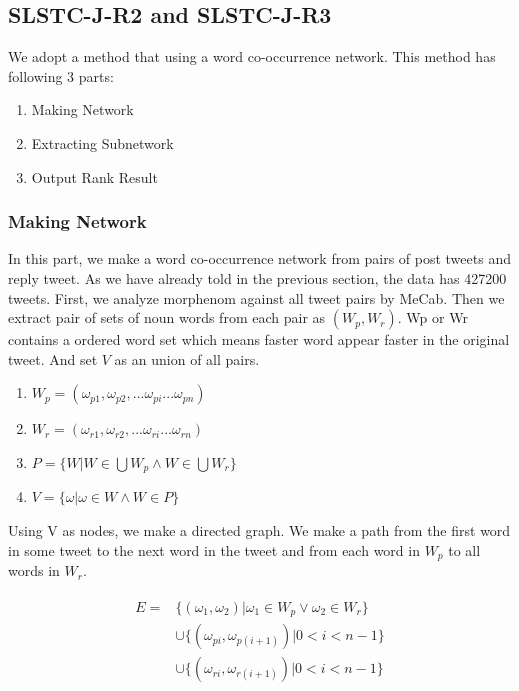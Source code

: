 \documentclass{../style/sig-alternate}
\begin{document}
\subsection{SLSTC-J-R2 and SLSTC-J-R3}
We adopt a method that using a word co-occurrence network.
This method has following 3 parts:
\begin{enumerate}
    \item Making Network
    \item Extracting Subnetwork
    \item Output Rank Result
\end{enumerate} 

\subsubsection{Making Network}
In this part, we make a word co-occurrence network from pairs of post tweets and reply tweet.
As we have already told in the previous section, the data has 427200 tweets. 
First, we analyze morphenom against all tweet pairs by MeCab. Then we extract pair of sets of noun words from each pair as \((W_{p}, W_{r})\). Wp or Wr contains a ordered word set which means faster word appear faster in the original tweet. And set \(V\) as an union of all pairs.

\begin{enumerate}
    \item \(W_{p} = (\omega_{p1}, \omega_{p2}, ... \omega_{pi} ... \omega_{pn}) \)
    \item \(W_{r} = (\omega_{r1}, \omega_{r2}, ... \omega_{ri} ... \omega_{rn}) \)
    \item \(P = \{W | W \in \bigcup W_{p} \wedge W \in \bigcup W_{r}\}\)
    \item \(V = \{\omega | \omega \in W \wedge W \in P\} \)
\end{enumerate}

Using V as nodes, we make a directed graph. We make a path from the first word in some tweet to the next word in the tweet and from each word in \( W_{p} \) to all words in \(W_{r} \).

\begin{eqnarray}
\begin{split}
E = &\{(\omega_{1}, \omega_{2}) | \omega_{1}\in W_{p} \lor \omega_{2}\in W_{r}\}\\
&\cup \{(\omega_{pi}, \omega_{p(i+1)}) | 0 < i < n-1\}\\
&\cup \{(\omega_{ri}, \omega_{r(i+1)}) | 0 < i < n-1\}
\end{split}
\end{eqnarray}
\end{document}
